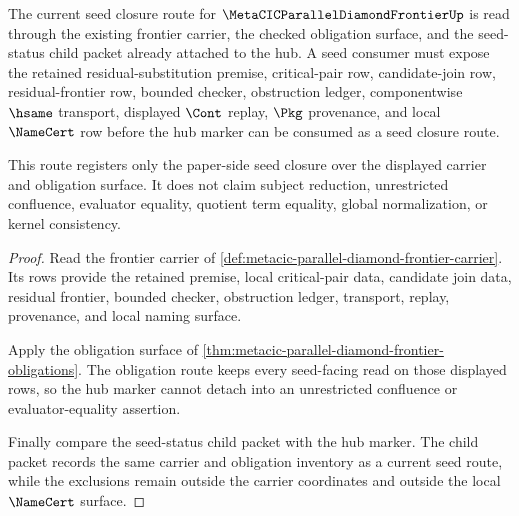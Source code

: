 \begin{theorem}
\label{thm:metacic-parallel-diamond-frontier-seed-closure-current-route}
The current seed closure route for $\MetaCICParallelDiamondFrontierUp$ is read through the existing frontier carrier, the checked obligation surface, and the seed-status child packet already attached to the hub. A seed consumer must expose the retained residual-substitution premise, critical-pair row, candidate-join row, residual-frontier row, bounded checker, obstruction ledger, componentwise $\hsame$ transport, displayed $\Cont$ replay, $\Pkg$ provenance, and local $\NameCert$ row before the hub marker can be consumed as a seed closure route.

This route registers only the paper-side seed closure over the displayed carrier and obligation surface. It does not claim subject reduction, unrestricted confluence, evaluator equality, quotient term equality, global normalization, or kernel consistency.
\end{theorem}
\begin{proof}
Read the frontier carrier of \autoref{def:metacic-parallel-diamond-frontier-carrier}. Its rows provide the retained premise, local critical-pair data, candidate join data, residual frontier, bounded checker, obstruction ledger, transport, replay, provenance, and local naming surface.

Apply the obligation surface of \autoref{thm:metacic-parallel-diamond-frontier-obligations}. The obligation route keeps every seed-facing read on those displayed rows, so the hub marker cannot detach into an unrestricted confluence or evaluator-equality assertion.

Finally compare the seed-status child packet with the hub marker. The child packet records the same carrier and obligation inventory as a current seed route, while the exclusions remain outside the carrier coordinates and outside the local $\NameCert$ surface.
\end{proof}
